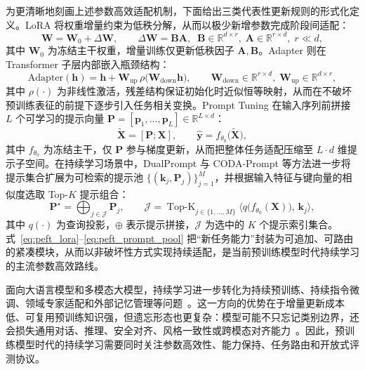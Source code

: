 为更清晰地刻画上述参数高效适配机制，下面给出三类代表性更新规则的形式化定义。LoRA 将权重增量约束为低秩分解，从而以极少新增参数完成阶段间适配：
\begin{equation}
\mathbf{W}=\mathbf{W}_0+\Delta\mathbf{W},\qquad \Delta\mathbf{W}=\mathbf{B}\mathbf{A},\;\;\mathbf{B}\in\mathbb{R}^{d\times r},\;\mathbf{A}\in\mathbb{R}^{r\times d},\;r\ll d,
\label{eq:peft_lora}
\end{equation}
其中 $\mathbf{W}_0$ 为冻结主干权重，增量训练仅更新低秩因子 $\mathbf{A},\mathbf{B}$。Adapter 则在 Transformer 子层内部嵌入瓶颈结构：
\begin{equation}
\mathrm{Adapter}(\mathbf{h})=\mathbf{h}+\mathbf{W}_{\mathrm{up}}\,\rho\bigl(\mathbf{W}_{\mathrm{down}}\mathbf{h}\bigr),\qquad \mathbf{W}_{\mathrm{down}}\in\mathbb{R}^{r\times d},\;\mathbf{W}_{\mathrm{up}}\in\mathbb{R}^{d\times r},
\label{eq:peft_adapter}
\end{equation}
其中 $\rho(\cdot)$ 为非线性激活，残差结构保证初始化时近似恒等映射，从而在不破坏预训练表征的前提下逐步引入任务相关变换。Prompt Tuning 在输入序列前拼接 $L$ 个可学习的提示向量 $\mathbf{P}=[\mathbf{p}_1,\ldots,\mathbf{p}_L]\in\mathbb{R}^{L\times d}$：
\begin{equation}
\tilde{\mathbf{X}}=[\mathbf{P};\mathbf{X}],\qquad \hat{\mathbf{y}}=f_{\theta_0}\bigl(\tilde{\mathbf{X}}\bigr),
\label{eq:peft_prompt}
\end{equation}
其中 $f_{\theta_0}$ 为冻结主干，仅 $\mathbf{P}$ 参与梯度更新，从而把整体任务适配压缩至 $L\!\cdot\!d$ 维提示子空间。在持续学习场景中，DualPrompt 与 CODA-Prompt 等方法进一步将提示集合扩展为可检索的提示池 $\{(\mathbf{k}_j,\mathbf{P}_j)\}_{j=1}^{M}$，并根据输入特征与键向量的相似度选取 Top-$K$ 提示组合：
\begin{equation}
\mathbf{P}^{\star}=\bigoplus_{j\in\mathcal{J}}\mathbf{P}_j,\qquad
\mathcal{J}=\mathop{\mathrm{Top}\text{-}K}_{j\in\{1,\ldots,M\}}\bigl\langle q\bigl(f_{\theta_0}(\mathbf{X})\bigr),\,\mathbf{k}_j\bigr\rangle,
\label{eq:peft_prompt_pool}
\end{equation}
其中 $q(\cdot)$ 为查询投影，$\oplus$ 表示提示拼接，$\mathcal{J}$ 为选中的 $K$ 个提示索引集合。式~\eqref{eq:peft_lora}--\eqref{eq:peft_prompt_pool} 把“新任务能力”封装为可追加、可路由的紧凑模块，从而以非破坏性方式实现持续适配，是当前预训练模型时代持续学习的主流参数高效路线。

面向大语言模型和多模态大模型，持续学习进一步转化为持续预训练、持续指令微调、领域专家适配和外部记忆管理等问题~\citep{cossu2024continual,shi2024llmcontinual,wang2025llm_cl_zh}。这一方向的优势在于增量更新成本低、可复用预训练知识强，但遗忘形态也更复杂：模型可能不只忘记类别边界，还会损失通用对话、推理、安全对齐、风格一致性或跨模态对齐能力~\citep{wang2024trace}。因此，预训练模型时代的持续学习需要同时关注参数高效性、能力保持、任务路由和开放式评测协议。

